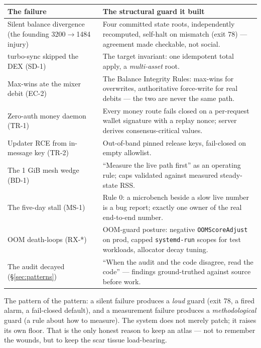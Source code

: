 \documentclass[10pt,a4paper]{article}
\begin{document}
\begin{center}
\small
{}
\renewcommand{\arraystretch}{1.4}
\begin{tabularx}{\textwidth}{@{}>{\RaggedRight\arraybackslash}p{5.2cm}>{\RaggedRight\arraybackslash}X@{}}
\toprule
The failure & The structural guard it built \\
\midrule
Silent balance divergence (the founding 3200$\to$1484 injury) & Four committed state
roots, independently recomputed, self-halt on mismatch (exit 78) — agreement made
checkable, not social. \\
turbo-sync skipped the DEX (SD-1) & The target invariant: one idempotent total apply, a
\emph{multi-asset} root. \\
Max-wins ate the mixer debit (EC-2) & The Balance Integrity Rules: max-wins for
overwrites, authoritative force-write for real debits — the two are never the same path. \\
Zero-auth money daemon (TR-1) & Every money route fails closed on a per-request
wallet signature with a replay nonce; server derives consensus-critical values. \\
Updater RCE from in-message key (TR-2) & Out-of-band pinned release keys, fail-closed on
empty allowlist. \\
The 1 GiB mesh wedge (BD-1) & ``Measure the live path first'' as an operating rule; caps
validated against measured steady-state RSS. \\
The five-day stall (MS-1) & Rule 0: a microbench beside a slow live number is a bug
report; exactly one owner of the real end-to-end number. \\
OOM death-loops (RX-*) & OOM-guard posture: negative \texttt{OOMScoreAdjust} on prod,
capped \texttt{systemd-run} scopes for test workloads, allocator decay tuning. \\
The audit decayed (\S\ref{sec:patterns}) & ``When the audit and the code disagree, read
the code'' — findings ground-truthed against source before work. \\
\bottomrule
\end{tabularx}
\end{center}

The pattern of the pattern: a silent failure produces a \emph{loud} guard (exit 78, a
fired alarm, a fail-closed default), and a measurement failure produces a
\emph{methodological} guard (a rule about how to measure). The system does not merely
patch; it raises its own floor. That is the only honest reason to keep an atlas — not to
remember the wounds, but to keep the scar tissue load-bearing.
\end{document}
